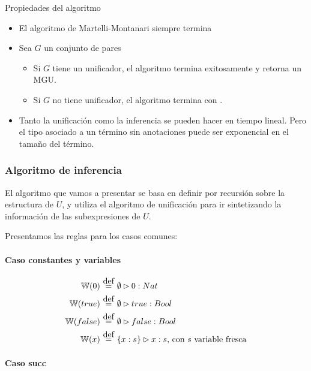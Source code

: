 \begin{teo}
  Propiedades del algoritmo
  \begin{itemize}
    \item El algoritmo de Martelli-Montanari siempre termina
    \item Sea $G$ un conjunto de pares
      \begin{itemize}
        \item Si $G$ tiene un unificador, el algoritmo termina exitosamente y retorna un MGU.
        \item Si $G$ no tiene unificador, el algoritmo termina con .
      \end{itemize}
    \item Tanto la unificación como la inferencia se pueden hacer en tiempo lineal. Pero el tipo asociado a un término sin anotaciones puede ser exponencial en el tamaño del término.
  \end{itemize}
\end{teo}

\subsubsection{Algoritmo de inferencia}

El algoritmo que vamos a presentar se basa en definir  por recursión sobre la estructura de $U$, y utiliza el algoritmo de unificación para ir sintetizando la información de las subexpresiones de $U$.

Presentamos las reglas para los casos comunes:

\paragraph{Caso constantes y variables}

\begin{align*}
  \w{0} &\eqdef \emptyset \rhd 0 : Nat \\
  \w{true} &\eqdef \emptyset \rhd true : Bool \\
  \w{false} &\eqdef \emptyset \rhd false : Bool \\
  \w{x} &\eqdef \{x:s\} \rhd x : s \text{, con $s$ variable fresca} \\
\end{align*}

\paragraph{Caso succ}

